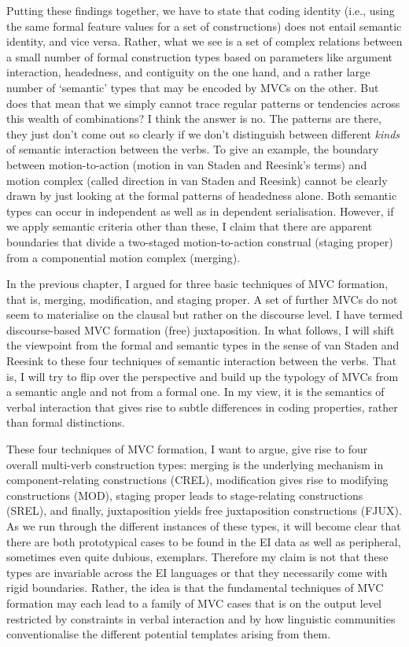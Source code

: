 Putting these findings together, we have to state that coding identity (i.e., using the same formal feature values for a set of constructions) does not entail semantic identity, and vice versa. Rather, what we see is a set of complex relations between a small number of formal construction types based on parameters like argument interaction, headedness, and contiguity on the one hand, and a rather large number of `semantic' types that may be encoded by MVCs on the other. But does that mean that we simply cannot trace regular patterns or tendencies across this wealth of combinations? I think the answer is no. The patterns are there, they just don't come out so clearly if we don't distinguish between different \emph{kinds} of semantic interaction between the verbs. To give an example, the boundary between motion-to-action (motion in van Staden and Reesink's terms) and motion complex (called direction in van Staden and Reesink) cannot be clearly drawn by just looking at the formal patterns of headedness alone. Both semantic types can occur in independent as well as in dependent serialisation. However, if we apply semantic criteria other than these, I claim that there are apparent boundaries that divide a two-staged motion-to-action construal (staging proper) from a componential motion complex (merging). 

In the previous chapter, I argued for three basic techniques of MVC formation, that is, merging, modification, and staging proper. A set of further MVCs do not seem to materialise on the clausal but rather on the discourse level. I have termed discourse-based MVC formation (free) juxtaposition. In what follows, I will shift the viewpoint from the formal and semantic types in the sense of van Staden and Reesink to these four techniques of semantic interaction between the verbs. That is, I will try to flip over the perspective and build up the typology of MVCs from a semantic angle and not from a formal one. In my view, it is the semantics of verbal interaction that gives rise to subtle differences in coding properties, rather than formal distinctions. 

These four techniques of MVC formation, I want to argue, give rise to four overall multi-verb construction types: merging is the underlying mechanism in component-relating constructions (CREL), modification gives rise to modifying constructions (MOD), staging proper leads to stage-relating constructions (SREL), and finally, juxtaposition yields free juxtaposition constructions (FJUX). As we run through the different instances of these types, it will become clear that there are both prototypical cases to be found in the EI data as well as peripheral, sometimes even quite dubious, exemplars. Therefore my claim is not that these types are invariable across the EI languages or that they necessarily come with rigid boundaries. Rather, the idea is that the fundamental techniques of MVC formation may each lead to a family of MVC cases that is on the output level restricted by constraints in verbal interaction and by how linguistic communities conventionalise the different potential templates arising from them. 

